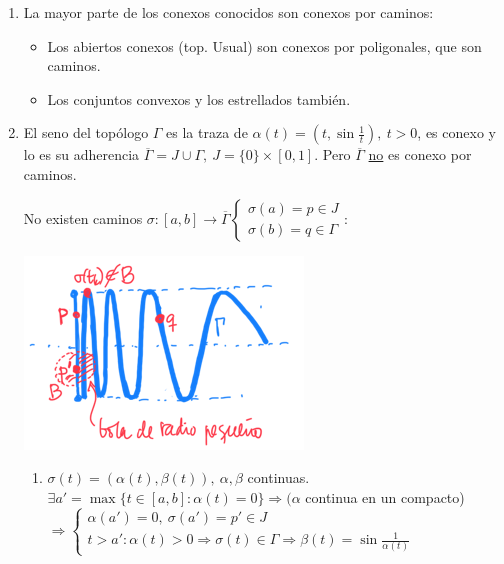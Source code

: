 \begin{ej}
\begin{enumerate}
    \item La mayor parte de los conexos conocidos son conexos por caminos:
    \begin{itemize}
        \item Los abiertos conexos (top. Usual) son conexos por poligonales, que son caminos.
        \item Los conjuntos convexos y los estrellados también.
    \end{itemize}
    \item El seno del topólogo $\Gamma$ es la traza de $\alpha\left( t \right) = \left( t, \sin\frac{1}{t} \right),\ t > 0$, es conexo y lo es su adherencia $\overline{\Gamma} = J \cup \Gamma,\ J = \{0\} \times \left[ 0, 1 \right]$. Pero $\overline{\Gamma}$ \underline{no} es conexo por caminos.
    \begin{demo}
        No existen caminos $\sigma: \left[ a, b \right] \rightarrow \overline{\Gamma} \begin{cases}
            \sigma\left( a \right) = p \in J\\
            \sigma\left( b \right) = q \in \Gamma
        \end{cases}$:
        \begin{center}
            \includegraphics[scale=0.3]{images/dem_sin_top_no_conx_caminos} 
        \end{center}
        \begin{enumerate}
            \item $\sigma\left( t \right) = \left( \alpha\left( t \right), \beta\left( t \right) \right),\ \alpha, \beta$ continuas. $\exists a' = \max \{t \in \left[ a, b \right] : \alpha\left( t \right) = 0\} \Rightarrow (\alpha$ continua en un compacto) %
            $\Rightarrow \begin{cases}
                \alpha\left( a' \right) = 0,\ \sigma\left( a' \right) = p' \in J\\
                t > a': \alpha\left( t \right) > 0 \Rightarrow \sigma\left( t \right) \in \Gamma \Rightarrow \beta\left( t \right) = \sin \frac{1}{\alpha\left( t \right)} 
            \end{cases} $


\end{enumerate}
\end{demo}
\end{enumerate}
\end{ej}
